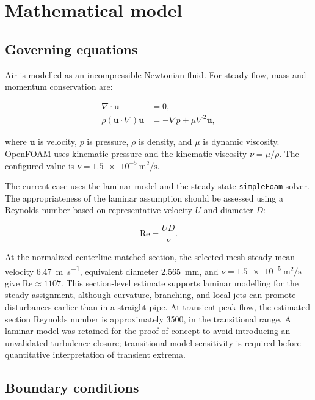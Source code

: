 \documentclass[11pt,a4paper]{article}
\begin{document}
\section{Mathematical model}
\label{sec:model}

\subsection{Governing equations}

Air is modelled as an incompressible Newtonian fluid. For steady flow, mass and
momentum conservation are:

\begin{align}
  \nabla \cdot \mathbf{u} &= 0, \\
  \rho (\mathbf{u}\cdot\nabla)\mathbf{u}
    &= -\nabla p + \mu \nabla^2\mathbf{u},
\end{align}

where $\mathbf{u}$ is velocity, $p$ is pressure, $\rho$ is density, and $\mu$
is dynamic viscosity. OpenFOAM uses kinematic pressure and the kinematic
viscosity $\nu=\mu/\rho$. The configured value is
$\nu=\SI{1.5e-5}{\metre\squared\per\second}$.

The current case uses the laminar model and the steady-state
\texttt{simpleFoam} solver. The appropriateness of the laminar assumption should
be assessed using a Reynolds number based on representative velocity $U$ and
diameter $D$:

\begin{equation}
  \mathrm{Re} = \frac{UD}{\nu}.
\end{equation}

At the normalized centerline-matched section, the selected-mesh steady mean
velocity \SI{6.47}{\metre\per\second}, equivalent diameter
\SI{2.565}{\milli\metre}, and $\nu=\SI{1.5e-5}{\metre\squared\per\second}$ give
$\mathrm{Re}\approx1107$. This section-level estimate supports laminar modelling
for the steady assignment, although curvature, branching, and local jets can
promote disturbances earlier than in a straight pipe. At transient peak flow,
the estimated section Reynolds number is approximately 3500, in the transitional
range. A laminar model was retained for the proof of concept to avoid introducing
an unvalidated turbulence closure; transitional-model sensitivity is required
before quantitative interpretation of transient extrema.

\subsection{Boundary conditions}
\end{document}
